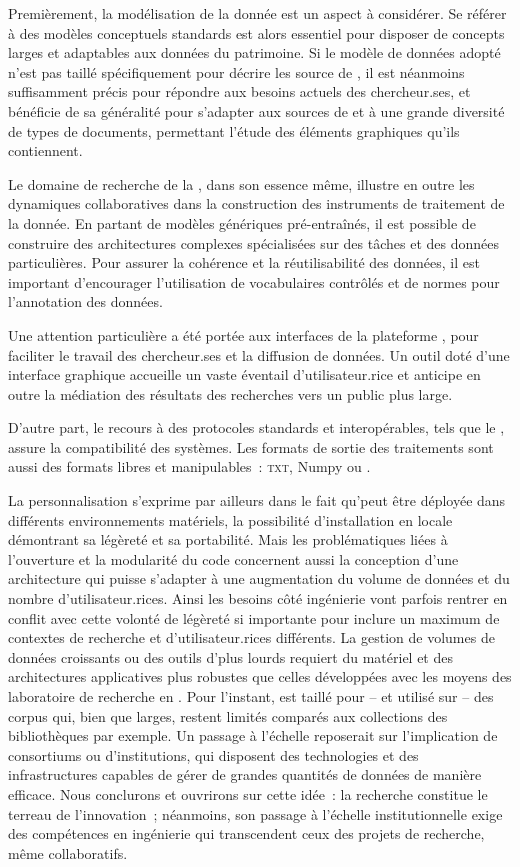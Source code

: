 Premièrement, la modélisation de la donnée est un aspect à considérer. Se référer à des modèles conceptuels standards est alors essentiel pour disposer de concepts larges et adaptables aux données du patrimoine. Si le modèle de données adopté n'est pas taillé spécifiquement pour décrire les source de \eida, il est néanmoins suffisamment précis pour répondre aux besoins actuels des chercheur.ses, et bénéficie de sa généralité pour s'adapter aux sources de \vhs et à une grande diversité de types de documents, permettant l'étude des éléments graphiques qu'ils contiennent. 

Le domaine de recherche de la \cv, dans son essence même, illustre en outre les dynamiques collaboratives dans la construction des instruments de traitement de la donnée. En partant de modèles génériques pré-entraînés, il est possible de construire des architectures complexes spécialisées sur des tâches et des données particulières. Pour assurer la cohérence et la réutilisabilité des données, il est important d'encourager l'utilisation de vocabulaires contrôlés et de normes pour l'annotation des données.

Une attention particulière a été portée aux interfaces de la plateforme \aikon, pour faciliter le travail des chercheur.ses et la diffusion de données. Un outil doté d'une interface graphique accueille un vaste éventail d'utilisateur.rice et anticipe en outre la médiation des résultats des recherches vers un public plus large. 

D'autre part, le recours à des protocoles standards et interopérables, tels que le \iiif, assure la compatibilité des systèmes. Les formats de sortie des traitements sont aussi des formats libres et manipulables~: \textsc{txt}, Numpy ou \svg. 

La personnalisation s'exprime par ailleurs dans le fait qu'\aikon peut être déployée dans différents environnements matériels, la possibilité d'installation en locale démontrant sa légèreté et sa portabilité. Mais les problématiques liées à l'ouverture et la modularité du code concernent aussi la conception d'une architecture qui puisse s'adapter à une augmentation du volume de données et du nombre d'utilisateur.rices. Ainsi les besoins côté ingénierie vont parfois rentrer en conflit avec cette volonté de légèreté si importante pour inclure un maximum de contextes de recherche et d'utilisateur.rices différents. La gestion de volumes de données croissants ou des outils d'\ia plus lourds requiert du matériel et des architectures applicatives plus robustes que celles développées avec les moyens des laboratoire de recherche en \shs. Pour l'instant, \aikon est taillé pour -- et utilisé sur -- des corpus qui, bien que larges, restent limités comparés aux collections des bibliothèques par exemple. Un passage à l'échelle reposerait sur l'implication de consortiums ou d'institutions, qui disposent des technologies et des infrastructures capables de gérer de grandes quantités de données de manière efficace. Nous conclurons et ouvrirons sur cette idée~: la recherche constitue le terreau de l'innovation~; néanmoins, son passage à l'échelle institutionnelle exige des compétences en ingénierie qui transcendent ceux des projets de recherche, même collaboratifs.